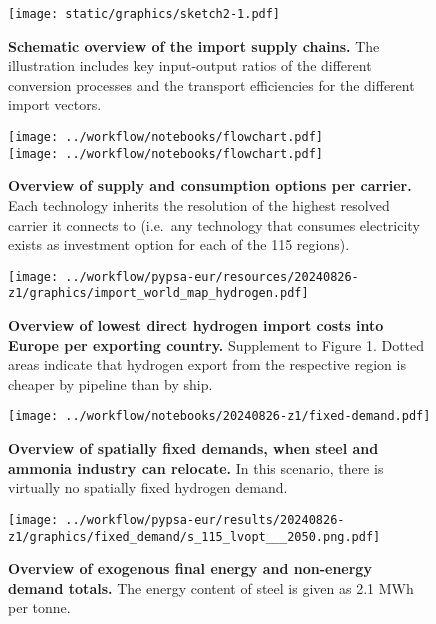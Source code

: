 
\newpage

\begin{figure*}[!htb]
    \centering
    \texttt{[image: static/graphics/sketch2-1.pdf]}
    \caption{\textbf{Schematic overview of the import supply chains.} The
    illustration includes key input-output ratios of the different conversion
    processes and the transport efficiencies for the different import vectors.}
    \label{fig:si:import-esc-scheme}
\end{figure*}

\begin{figure}[!htb]
    \texttt{[image: ../workflow/notebooks/flowchart.pdf]} \\
    \texttt{[image: ../workflow/notebooks/flowchart.pdf]}
    \caption{\textbf{Overview of supply and consumption options per carrier.}
    Each technology inherits the resolution of the highest resolved carrier it
    connects to (i.e.~any technology that consumes electricity exists as
    investment option for each of the 115 regions).}
    \label{fig:si:supply-consumption-options}
\end{figure}

\begin{figure}[!htb]
    \texttt{[image: ../workflow/pypsa-eur/resources/20240826-z1/graphics/import\_world\_map\_hydrogen.pdf]} \\
    \caption{\textbf{Overview of lowest direct hydrogen import costs into Europe
    per exporting country.} Supplement to Figure 1. Dotted areas indicate that
    hydrogen export from the respective region is cheaper by pipeline than by
    ship.}
    \label{fig:si:worlmap-h2}
\end{figure}


\begin{figure}[!htb]
    \texttt{[image: ../workflow/notebooks/20240826-z1/fixed-demand.pdf]} \\
    \caption{\textbf{Overview of spatially fixed demands, when steel and ammonia
    industry can relocate.} In this scenario, there is virtually no spatially
    fixed hydrogen demand.}
    \label{fig:si:demands}
\end{figure}

\begin{figure}[!htb]
    \texttt{[image: ../workflow/pypsa-eur/results/20240826-z1/graphics/fixed\_demand/s\_115\_lvopt\_\_\_2050.png.pdf]} \\
    \caption{\textbf{Overview of exogenous final energy and non-energy demand totals.}
    The energy content of steel is given as 2.1 MWh per tonne.
    }
    \label{fig:si:demand_totals}
\end{figure}


